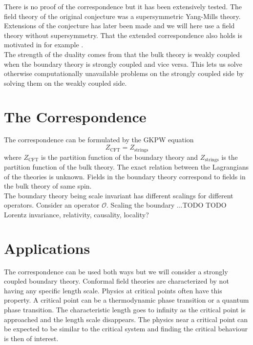 \documentclass[12pt]{report}
\begin{document}
There is no proof of the correspondence but it has been extensively tested. The field theory of the original conjecture\cite{Maldacena:1997re} was a supersymmetric Yang-Mills theory. Extensions of the conjecture has later been made and we will here use a field theory without supersymmetry. That the extended correspondence also holds is motivated in for example \cite{McGreevy:2009xe}.\\

The strength of the duality comes from that the bulk theory is weakly coupled when the boundary theory is strongly coupled and vice versa. This lets us solve otherwise computationally unavailable problems on the strongly coupled side by solving them on the weakly coupled side.\\


\section{The Correspondence\label{correspondence}}
The correspondence can be formulated by the GKPW equation \cite{Witten:1998qj}
\begin{equation}
 Z_{\text{CFT}}=Z_{\text{strings}}
\label{GKPW}
\end{equation}
where $Z_{\text{CFT}}$ is the partition function of the boundary theory and $Z_{\text{strings}}$ is the partition function of the bulk theory. The exact relation between the Lagrangians of the theories is unknown. Fields in the boundary theory correspond to fields in the bulk theory of same spin.\\
The boundary theory being scale invariant has different scalings for different operators. Consider an operator $\mathcal{O}$. Scaling the boundary ...TODO
TODO
Lorentz invariance, relativity, causality, locality?
\section{Applications}
The correspondence can be used both ways but we will consider a strongly coupled boundary theory. Conformal field theories are characterized by not having any specific length scale. Physics at critical points often have this property. A critical point can be a thermodynamic phase transition or a quantum phase transition. The characteristic length goes to infinity as the critical point is approached and the length scale disappears. The physics near a critical point can be expected to be similar to the critical system and finding the critical behaviour is then of interest.\\
\end{document}
